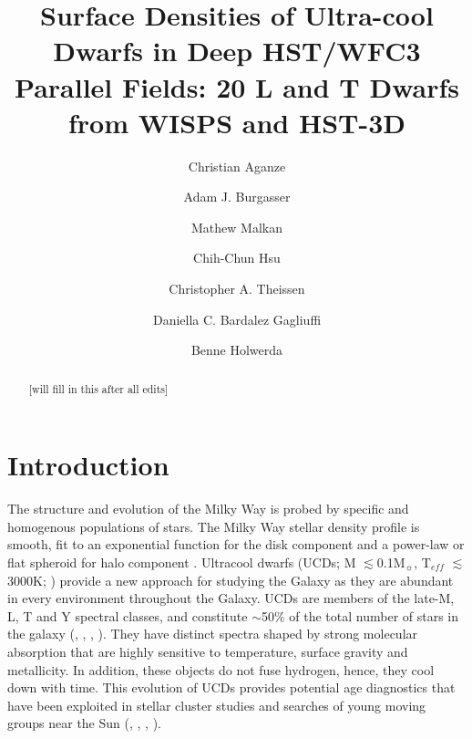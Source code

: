 \documentclass[manuscript]{aastex}
\begin{document}
\newcommand{\meth}{CH$_4 $ }
\newcommand{\wat}{H$_2$O }
\newcommand{\teff}{T$_{eff}$ }
\newcommand{\Msun}{M$_\sun$}

\title{Surface Densities of Ultra-cool Dwarfs in Deep HST/WFC3 Parallel Fields:  20 L and T Dwarfs from WISPS and HST-3D}

\author{Christian Aganze}
\author{Adam J. Burgasser }

\author{Mathew Malkan}

\author{Chih-Chun Hsu}

\author[0000-0002-9807-5435]{Christopher A. Theissen}

\author{Daniella C. Bardalez Gagliuffi}

\author{Benne Holwerda}

\begin{abstract}
[will fill in this after all edits]
\end{abstract}


\section{Introduction}


The structure and evolution of the Milky Way is probed by specific and homogenous populations of stars. The Milky Way stellar density profile is smooth, fit to an exponential function for the disk component and a power-law or flat spheroid for halo component \citep{2008ApJ...673..864J}. Ultracool dwarfs (UCDs; M $\lesssim$0.1\Msun, {\teff} $\lesssim$3000K;  \citealt{2005ARA&A..43..195K}) provide a new approach for studying the Galaxy as they are abundant in  every environment throughout the Galaxy. UCDs are members of the late-M, L, T and Y spectral classes, and constitute $\sim$50\% of the total number of stars in the galaxy (\citealt{2007AJ....133..439C}, \citealt{2000ARA&A..38..337C}, \citealt{2001RvMP...73..719B},  \citealt{2010AJ....139.2679B}). They have distinct spectra shaped by strong molecular absorption that are highly sensitive to temperature, surface gravity and metallicity. In addition, these objects do not fuse hydrogen, hence, they cool down with time. This evolution of UCDs provides potential age diagnostics that have been exploited in stellar cluster studies \citep{1998ASPC..134..394B,luhman2012,martin2017} and searches of young moving groups near the Sun (\citealt{LopezSantiago2006}, \citealt{Gagne2015},  \citealt{Mamajek2015}, \citealt{Faherty2018}). 
\end{document}
